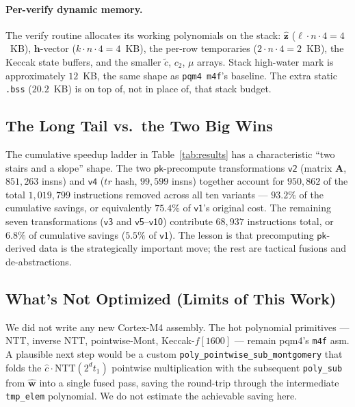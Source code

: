 \documentclass[11pt,a4paper]{article}
\newcommand{\NTT}{\mathrm{NTT}}
\begin{document}
\paragraph{Per-verify dynamic memory.} The verify routine allocates
its working polynomials on the stack: $\hat{\mathbf{z}}$ ($\ell \cdot
n \cdot 4 = 4$~KB), $\mathbf{h}$-vector ($k \cdot n \cdot 4 = 4$~KB),
the per-row temporaries ($2 \cdot n \cdot 4 = 2$~KB), the Keccak
state buffers, and the smaller $\tilde c$, $c_2$, $\mu$ arrays.
Stack high-water mark is approximately $12$~KB, the same shape as
\texttt{pqm4 m4f}'s baseline. The extra static \texttt{.bss}
($20.2$~KB) is on top of, not in place of, that stack budget.

\subsection{The Long Tail vs.\ the Two Big Wins}

The cumulative speedup ladder in Table~\ref{tab:results} has a
characteristic ``two stairs and a slope'' shape. The two
$\textsf{pk}$-precompute transformations $\textsf{v2}$ (matrix
$\mathbf{A}$, $851{,}263$ insns) and $\textsf{v4}$ ($tr$ hash,
$99{,}599$ insns) together account for $950{,}862$ of the total
$1{,}019{,}799$ instructions removed across all ten variants ---
$93.2\%$ of the cumulative savings, or equivalently $75.4\%$ of
$\textsf{v1}$'s original cost. The remaining seven transformations
($\textsf{v3}$ and $\textsf{v5}$--$\textsf{v10}$) contribute
$68{,}937$ instructions total, or $6.8\%$ of cumulative savings
($5.5\%$ of $\textsf{v1}$). The lesson is that precomputing
$\textsf{pk}$-derived data is the strategically important move; the
rest are tactical fusions and de-abstractions.

\subsection{What's Not Optimized (Limits of This Work)}

We did not write any new Cortex-M4 assembly. The hot polynomial
primitives --- NTT, inverse NTT, pointwise-Mont, Keccak-$f[1600]$ ---
remain pqm4's \texttt{m4f} asm. A plausible next step would be a
custom \texttt{poly\_pointwise\_sub\_montgomery} that folds the
$\hat c \cdot \NTT(2^d t_1)$ pointwise multiplication with the
subsequent \texttt{poly\_sub} from $\hat{\mathbf{w}}$ into a single
fused pass, saving the round-trip through the intermediate
\texttt{tmp\_elem} polynomial. We do not estimate the achievable
saving here.
\end{document}
